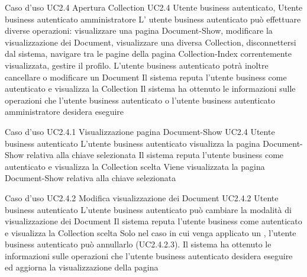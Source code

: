 \UCtitle
{Caso d'uso UC2.4}
{Apertura Collection}
\UC
{UC2.4}
{Utente business autenticato, Utente business autenticato amministratore}
{L’ utente business autenticato può effettuare diverse operazioni: visualizzare una pagina Document-Show, modificare la visualizzazione dei Document, visualizzare una diversa Collection, disconnettersi dal sistema, navigare tra le pagine della pagina Collection-Index correntemente visualizzata,  gestire il profilo. L'utente business autenticato  potrà inoltre cancellare o modificare un Document}
{Il sistema reputa l'utente business come autenticato e visualizza la Collection}
\post
{Il sistema ha ottenuto le informazioni sulle operazioni che l'utente business autenticato o l'utente business autenticato amministratore desidera eseguire}



\UCtitle
{Caso d'uso UC2.4.1}
{Visualizzazione pagina Document-Show}
\UC
{UC2.4}
{Utente business autenticato}
{L'utente business autenticato visualizza la pagina Document-Show relativa alla chiave selezionata}
{Il sistema reputa l'utente business come autenticato e visualizza la Collection scelta}
\post
{Viene visualizzata la pagina Document-Show relativa alla chiave selezionata}


\UCtitle
{Caso d'uso UC2.4.2}
{Modifica visualizzazione dei Document}
\UC
{UC2.4.2}
{Utente business autenticato}
{L'utente business autenticato può cambiare la modalità di visualizzazione dei Document}
{Il sistema reputa l'utente business come autenticato e visualizza la Collection scelta}
\estensioni
{Solo nel caso in cui venga applicato un , l'utente business autenticato può annullarlo (UC2.4.2.3).}
\post
{Il sistema ha ottenuto le informazioni sulle operazioni che l'utente business autenticato desidera eseguire ed aggiorna la visualizzazione della pagina}

